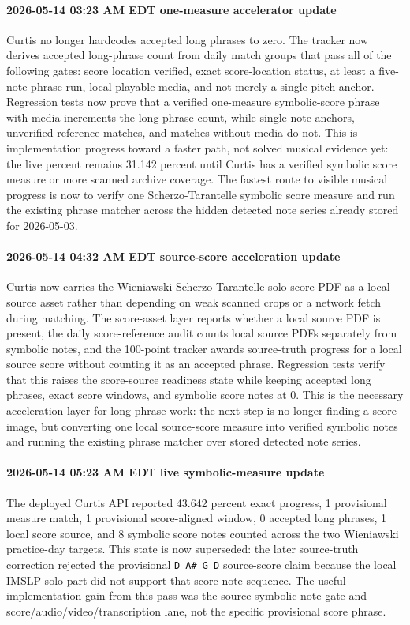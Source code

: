 \paragraph{2026-05-14 03:23 AM EDT one-measure accelerator update} Curtis no longer hardcodes accepted long phrases to zero. The tracker now derives accepted long-phrase count from daily match groups that pass all of the following gates: score location verified, exact score-location status, at least a five-note phrase run, local playable media, and not merely a single-pitch anchor. Regression tests now prove that a verified one-measure symbolic-score phrase with media increments the long-phrase count, while single-note anchors, unverified reference matches, and matches without media do not. This is implementation progress toward a faster path, not solved musical evidence yet: the live percent remains 31.142 percent until Curtis has a verified symbolic score measure or more scanned archive coverage. The fastest route to visible musical progress is now to verify one Scherzo-Tarantelle symbolic score measure and run the existing phrase matcher across the hidden detected note series already stored for 2026-05-03.
\paragraph{2026-05-14 04:32 AM EDT source-score acceleration update} Curtis now carries the Wieniawski Scherzo-Tarantelle solo score PDF as a local source asset rather than depending on weak scanned crops or a network fetch during matching. The score-asset layer reports whether a local source PDF is present, the daily score-reference audit counts local source PDFs separately from symbolic notes, and the 100-point tracker awards source-truth progress for a local source score without counting it as an accepted phrase. Regression tests verify that this raises the score-source readiness state while keeping accepted long phrases, exact score windows, and symbolic score notes at 0. This is the necessary acceleration layer for long-phrase work: the next step is no longer finding a score image, but converting one local source-score measure into verified symbolic notes and running the existing phrase matcher over stored detected note series.
\paragraph{2026-05-14 05:23 AM EDT live symbolic-measure update} The deployed Curtis API reported 43.642 percent exact progress, 1 provisional measure match, 1 provisional score-aligned window, 0 accepted long phrases, 1 local score source, and 8 symbolic score notes counted across the two Wieniawski practice-day targets. This state is now superseded: the later source-truth correction rejected the provisional \texttt{D A\# G D} source-score claim because the local IMSLP solo part did not support that score-note sequence. The useful implementation gain from this pass was the source-symbolic note gate and score/audio/video/transcription lane, not the specific provisional score phrase.
